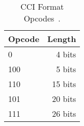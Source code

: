 \begin{table}
	\centering
	\begin{tabular}{lr}
		Opcode & Length \\
		\hline
		0 & 4 bits \\
		100 & 5 bits \\
		110 & 15 bits \\
		101 & 20 bits \\
		111 & 26 bits
	\end{tabular}

	\caption{CCI Format Opcodes~\cite{Lawlor:2013:compression}.}
	\label{tab:bg-comp-opcode-CCIdecodeTable}
\end{table}